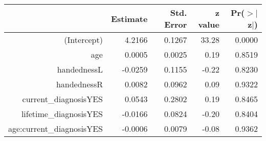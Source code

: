 \begin{table}[ht]
\centering
\begin{tabular}{rrrrr}
  \hline
 & Estimate & Std. Error & z value & Pr($>$$|$z$|$) \\ 
  \hline
(Intercept) & 4.2166 & 0.1267 & 33.28 & 0.0000 \\ 
  age & 0.0005 & 0.0025 & 0.19 & 0.8519 \\ 
  handednessL & -0.0259 & 0.1155 & -0.22 & 0.8230 \\ 
  handednessR & 0.0082 & 0.0962 & 0.09 & 0.9322 \\ 
  current\_diagnosisYES & 0.0543 & 0.2802 & 0.19 & 0.8465 \\ 
  lifetime\_diagnosisYES & -0.0166 & 0.0824 & -0.20 & 0.8404 \\ 
  age:current\_diagnosisYES & -0.0006 & 0.0079 & -0.08 & 0.9362 \\ 
   \hline
\end{tabular}
\end{table}
